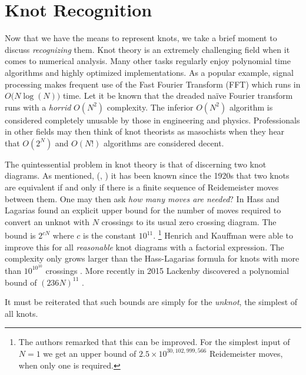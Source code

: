 \section{Knot Recognition}
    Now that we have the means to represent knots, we take a brief moment to
    discuss \textit{recognizing} them. Knot theory is an extremely
    challenging field when it comes to numerical
    analysis. Many other tasks regularly enjoy polynomial time algorithms and
    highly optimized implementations. As a popular example, signal processing
    makes frequent use of the Fast Fourier Transform (FFT) which runs in
    $O\big(N\log(N)\big)$ time. Let it be known that the dreaded na\"{i}ve
    Fourier transform runs with a \textit{horrid} $O(N^{2})$ complexity.
    The inferior $O(N^{2})$ algorithm is considered completely unusable by
    those in engineering and physics.
    Professionals in other fields may then think of
    knot theorists as masochists when they hear that $O(2^{N})$ and
    $O(N!)$ algorithms are considered decent.
    \par\hfill\par
    The quintessential problem in knot theory is that of discerning two knot
    diagrams. As mentioned,
    (\cite{Reidemeister1927}, \cite{AlexanderBriggs1926}) it has been known
    since the 1920s that two knots are equivalent if and only if there is a
    finite sequence of Reidemeister moves between them. One may then ask
    \textit{how many moves are needed}?
    In \cite{HassLagarias2001} Hass and Lagarias found an
    explicit upper bound for the number of moves required to convert an
    unknot with $N$ crossings to its usual zero crossing diagram. The
    bound is $2^{cN}$ where $c$ is the constant $10^{11}$.%
    \footnote{%
        The authors remarked that this can be improved.
        For the simplest input of $N=1$ we get an upper bound of
        $2.5\times{10}^{30,102,999,566}$ Reidemeister moves,
        when only one is required.
    }
    Henrich and Kauffman were able to improve this for all \textit{reasonable}
    knot diagrams with a factorial expression. The complexity only grows
    larger than the Hass-Lagarias formula for knots with more than
    $10^{10^{10}}$ crossings \cite{HenrichKauffman2010Unknotting}. More
    recently in 2015 Lackenby discovered a polynomial bound of
    $(236N)^{11}$ \cite{Lackenby2015Unknotting}.
    \par\hfill\par
    It must be reiterated that such bounds are simply for the
    \textit{unknot}, the simplest of all knots.
